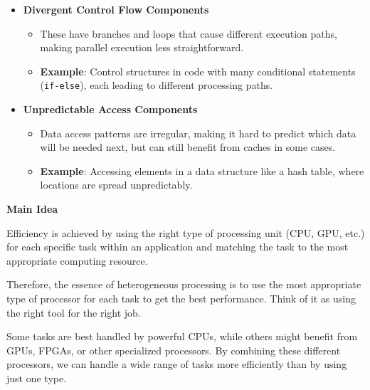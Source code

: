 \begin{itemize}
    \item \textbf{Divergent Control Flow Components}
    \begin{itemize}
        \item These have branches and loops that cause different execution paths, making parallel execution less straightforward.
        \item \textcolor{Green3}{\textbf{Example}}: Control structures in code with many conditional statements (\texttt{if-else}), each leading to different processing paths.
    \end{itemize}
 
    \item \textbf{Unpredictable Access Components}
    \begin{itemize}
        \item Data access patterns are irregular, making it hard to predict which data will be needed next, but can still benefit from caches in some cases.
        \item \textcolor{Green3}{\textbf{Example}}: Accessing elements in a data structure like a hash table, where locations are spread unpredictably.
    \end{itemize}
\end{itemize}

\newpage

\begin{flushleft}
    \textcolor{Green3}{ \textbf{Main Idea}}
\end{flushleft}
Efficiency is achieved by using the right type of processing unit (CPU, GPU, etc.) for each specific task within an application and matching the task to the most appropriate computing resource.

\highspace
Therefore, the essence of heterogeneous processing is to use the most appropriate type of processor for each task to get the best performance. Think of it as using the right tool for the right job.

\highspace
Some tasks are best handled by powerful CPUs, while others might benefit from GPUs, FPGAs, or other specialized processors. By combining these different processors, we can handle a wide range of tasks more efficiently than by using just one type.

